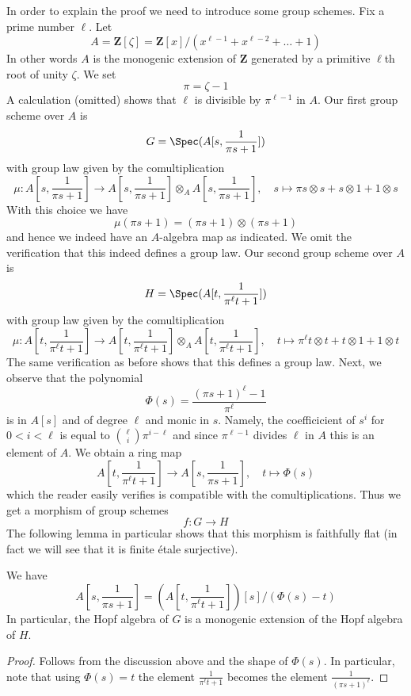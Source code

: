 \noindent
In order to explain the proof we need to introduce some group schemes.
Fix a prime number $\ell$. Let
$$
A = \mathbf{Z}[\zeta] =
\mathbf{Z}[x]/(x^{\ell - 1} + x^{\ell - 2} + \ldots + 1)
$$
In other words $A$ is the monogenic extension of $\mathbf{Z}$ generated by
a primitive $\ell$th root of unity $\zeta$. We set
$$
\pi = \zeta - 1
$$
A calculation (omitted) shows that $\ell$ is divisible by $\pi^{\ell - 1}$
in $A$. Our first group scheme over $A$ is
$$
G = \Spec(A[s, \frac{1}{\pi s + 1}])
$$
with group law given by the comultiplication
$$
\mu :
A[s, \frac{1}{\pi s + 1}]
\longrightarrow
A[s, \frac{1}{\pi s + 1}] \otimes_A A[s, \frac{1}{\pi s + 1}],\quad
s \longmapsto \pi s \otimes s + s \otimes 1 + 1 \otimes s
$$
With this choice we have
$$
\mu(\pi s + 1) = (\pi s + 1) \otimes (\pi s + 1)
$$
and hence we indeed have an $A$-algebra map as indicated. We omit the
verification that this indeed defines a group law. Our second group
scheme over $A$ is
$$
H = \Spec(A[t, \frac{1}{\pi^\ell t + 1}])
$$
with group law given by the comultiplication
$$
\mu : A[t, \frac{1}{\pi^\ell t + 1}]
\longrightarrow
A[t, \frac{1}{\pi^\ell t + 1}] \otimes_A A[t, \frac{1}{\pi^\ell t + 1}],\quad
t \longmapsto \pi^\ell t \otimes t + t \otimes 1 + 1 \otimes t
$$
The same verification as before shows that this defines a group law.
Next, we observe that the polynomial
$$
\Phi(s) = \frac{(\pi s + 1)^\ell - 1}{\pi^\ell}
$$
is in $A[s]$ and of degree $\ell$ and monic in $s$. Namely, the coefficicient
of $s^i$ for $0 < i < \ell$ is equal to ${\ell \choose i}\pi^{i - \ell}$
and since $\pi^{\ell - 1}$ divides $\ell$ in $A$ this is an element of $A$.
We obtain a ring map
$$
A[t, \frac{1}{\pi^\ell t + 1}]
\longrightarrow
A[s, \frac{1}{\pi s + 1}],\quad
t \longmapsto \Phi(s)
$$
which the reader easily verifies is compatible with the comultiplications.
Thus we get a morphism of group schemes
$$
f : G \to H
$$
The following lemma in particular shows that this morphism is faithfully
flat (in fact we will see that it is finite \'etale surjective).

\begin{lemma}
\label{lemma-monogenic-one}
We have
$$
A[s, \frac{1}{\pi s + 1}] =
\left(A[t, \frac{1}{\pi^\ell t + 1}]\right)[s]/(\Phi(s) - t)
$$
In particular, the Hopf algebra of $G$ is a monogenic extension
of the Hopf algebra of $H$.
\end{lemma}

\begin{proof}
Follows from the discussion above and the shape of $\Phi(s)$.
In particular, note that using $\Phi(s) = t$ the element
$\frac{1}{\pi^\ell t + 1}$ becomes the element
$\frac{1}{(\pi s + 1)^\ell}$.
\end{proof}

